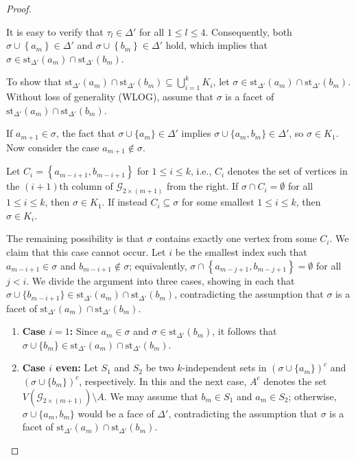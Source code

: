 \documentclass[11pt,reqno,a4paper]{amsart}
\theoremstyle{definition}
\theoremstyle{theorem}
\newcommand{\lno}{\left(}
\newcommand{\rno}{\right)}
\newcommand{\lcu}{\left\{}
\newcommand{\rcu}{\right\}}
\newcommand{\st}{\mathrm{st}}
\theoremstyle{remark}
\begin{document}
\begin{proof}
\begin{enumerate}
It is easy to verify that $\tau_l \in \Delta'$ for all $1 \leq l \leq 4$. Consequently, both $\sigma \cup \lcu a_m \rcu \in \Delta'$ and $\sigma \cup \lcu b_m \rcu \in \Delta'$ hold, which implies that $\sigma \in \st_{\Delta'}\lno a_m \rno \cap \st_{\Delta'}\lno b_m \rno.$

To show that $\st_{\Delta'}\lno a_m \rno \cap \st_{\Delta'}\lno b_m \rno \subseteq \bigcup\limits_{i=1}^k K_i$,
let $\sigma \in \st_{\Delta'}\lno a_m \rno \cap \st_{\Delta'}\lno b_m \rno$. 
Without loss of generality (WLOG), assume that $\sigma$ is a facet of $ \st_{\Delta'}\lno a_m \rno \cap \st_{\Delta'}\lno b_m \rno$. 

If $a_{m+1} \in \sigma$, the fact that $\sigma \cup \{a_m\} \in \Delta'$ implies 
$\sigma \cup \{a_m,b_m\} \in \Delta'$, so $\sigma \in K_1$. 
Now consider the case $a_{m+1} \notin \sigma$. 

Let $C_i = \lcu a_{m-i+1}, b_{m-i+1} \rcu$ for $1 \le i \le k$, 
i.e., $C_i$ denotes the set of vertices in the $(i+1)$th column of $\mathcal{G}_{2\times(m+1)}$ from the right. 
If $\sigma \cap C_i = \emptyset$ for all $1 \le i \le k$, then $\sigma \in K_1$. 
If instead $C_i \subseteq \sigma$ for some smallest $1 \le i \le k$, then $\sigma \in K_i$. 

The remaining possibility is that $\sigma$ contains exactly one vertex from some $C_i$. 
We claim that this case cannot occur. 
Let $i$ be the smallest index such that $a_{m-i+1} \in \sigma$ and $b_{m-i+1} \notin \sigma$; 
equivalently, $\sigma \cap \lcu a_{m-j+1}, b_{m-j+1} \rcu = \emptyset$ for all $j < i$. 
We divide the argument into three cases, showing in each that 
$\sigma \cup \{b_{m-i+1}\} \in \st_{\Delta'}\lno a_m \rno \cap \st_{\Delta'}\lno b_m \rno$, 
contradicting the assumption that $\sigma$ is a facet of $\st_{\Delta'}\lno a_m \rno \cap \st_{\Delta'}\lno b_m \rno$.
    
    \begin{enumerate}
        \item \textbf{Case $i=1$:} 
        Since $a_m \in \sigma$ and $\sigma \in \st_{\Delta'}\lno b_m \rno$, it follows that 
        $\sigma \cup \{b_m\} \in \st_{\Delta'}\lno a_m \rno \cap \st_{\Delta'}\lno b_m \rno$.
    
        \item \textbf{Case $i$ even:} 
        Let $S_1$ and $S_2$ be two $k$-independent sets in $(\sigma \cup \{a_m\})^c$ and $(\sigma \cup \{b_m\})^c$, respectively. 
        In this and the next case, $A^c$ denotes the set $V(\mathcal{G}_{2\times (m+1)}) \setminus A$. 
        We may assume that $b_m \in S_1$ and $a_m \in S_2$; otherwise, 
        $\sigma \cup \{a_m,b_m\}$ would be a face of $\Delta'$, contradicting the assumption that 
        $\sigma$ is a facet of $\st_{\Delta'}\lno a_m \rno \cap \st_{\Delta'}\lno b_m \rno$. 


\end{enumerate}
\end{enumerate}
\end{proof}
\end{document}
